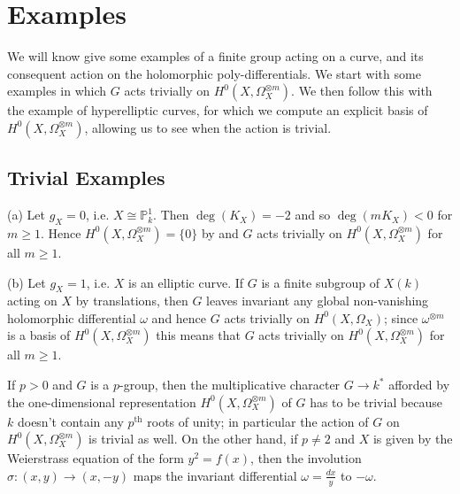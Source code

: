 \newpage

\section{Examples}
We will know give some examples of a finite group acting on a curve, and its consequent action on the holomorphic poly-differentials. 
We start with some examples in which $G$ acts trivially on $H^0(X,\Omega_X^{\otimes m})$.
We then follow this with the example of hyperelliptic curves, for which we compute an explicit basis of $H^0(X,\Omega_X^{\otimes m})$, allowing us to see when the action is trivial.


\subsection{Trivial Examples}\label{examplessection}

\begin{comment}
  (a) If $g_X = 0$ then $\deg(K_X)=-2$ and so $\deg(mK_X)<0$ for $m\geq1$. 
  Hence it follows that $H^0(X,\Omega_X^{\otimes m}) = \{0\}$ and $G$ acts trivially for all $m\geq 1$.

  
  (b) Suppose $g_X =1 $ (i.e. $X$ is an elliptic curve) and that $G$ is a finite subgroup of $X(k)$ acting on $X$ by translations.
  Then $G$ leaves invariant any global non-vanishing holomorphic differential $\omega$ and hence $G$ acts trivially on $H^0(X,\Omega_X)$.
  Since $\omega^{\otimes m}$ is a basis of $H^0(X,\Omega_X^{\otimes m})$, this means that $G$ also acts trivially on  $H^0(X,\Omega_X^{\otimes m})$.
\end{comment}

(a) Let $g_X = 0$, i.e. $X\cong \mathbb P_k^1$.
Then $\deg(K_X) = -2$ and so $\deg(mK_X) < 0$ for $m\geq 1$.
Hence $H^0(X,\Omega_X^{\otimes m}) =\{0\}$ by \cite[Lem. 2, pg. 295]{hart} and $G$ acts trivially on $H^0(X,\Omega_X^{\otimes m})$ for all $m\geq 1$.

(b) Let $g_X = 1$, i.e. $X$ is an elliptic curve.
If $G$ is a finite subgroup of $X(k)$ acting on $X$ by translations, then $G$ leaves invariant any global non-vanishing holomorphic differential $\omega$ and hence $G$ acts trivially on $H^0(X,\Omega_X)$;
since $\omega^{\otimes m}$ is a basis of $H^0(X,\Omega_X^{\otimes m})$ this means that $G$ acts trivially on $H^0(X,\Omega_X^{\otimes m})$ for all $m\geq 1$.

If $p>0$ and $G$ is a $p$-group, then the multiplicative character $G\rightarrow k^*$ afforded by the one-dimensional representation $H^0(X,\Omega_X^{\otimes m})$ of $G$ has to be trivial because $k$ doesn't contain any $p^{\mbox{th}}$ roots of unity;
in particular the action of $G$ on $H^0(X,\Omega_X^{\otimes m})$ is trivial as well.
On the other hand, if $p\neq 2$ and $X$ is given by the Weierstrass equation of the form $y^2 = f(x)$, then the involution $\sigma : (x,y) \rightarrow (x,-y)$ maps the invariant differential $\omega = \frac{dx}{y}$ to $-\omega$.
  
